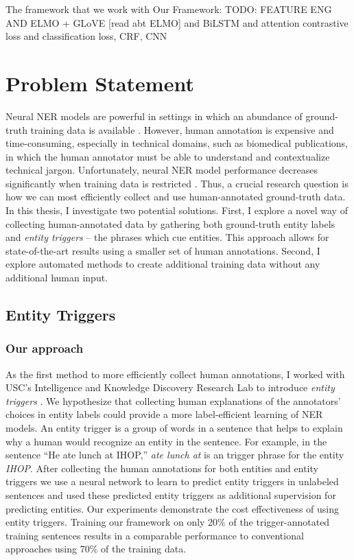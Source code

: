 The framework that we work with
Our Framework:
TODO: FEATURE ENG AND ELMO + GLoVE [read abt ELMO] and BiLSTM and attention contrastive loss and classification loss, CRF, CNN

\section{Problem Statement}
Neural NER models are powerful in settings in which an abundance of ground-truth training data is available \citep{LampleNER}. However, human annotation is expensive and time-consuming, especially in technical domains, such as biomedical publications, in which the human annotator must be able to understand and contextualize technical jargon. Unfortunately, neural NER model performance decreases significantly when training data is restricted \citep{TriggerNER}. Thus, a crucial research question is how we can most efficiently collect and use human-annotated ground-truth data. In this thesis, I investigate two potential solutions. First, I explore a novel way of collecting human-annotated data by gathering both ground-truth entity labels and \textit{entity triggers} -- the phrases which cue entities. This approach allows for state-of-the-art results using a smaller set of human annotations. Second, I explore automated methods to create additional training data without any additional human input.

\subsection{Entity Triggers}
\subsubsection{Our approach}
As the first method to more efficiently collect human annotations, I worked with USC's Intelligence and Knowledge Discovery Research Lab to introduce \textit{entity triggers} \citep{TriggerNER}. We hypothesize that collecting human explanations of the annotators' choices in entity labels could provide a more label-efficient learning of NER models. An entity trigger is a group of words in a sentence that helps to explain why a human would recognize an entity in the sentence. For example, in the sentence ``He ate lunch at IHOP,'' \textit{ate lunch at} is an trigger phrase for the entity \textit{IHOP}. After collecting the human annotations for both entities and entity triggers we use a neural network to learn to predict entity triggers in unlabeled sentences and used these predicted entity triggers as additional supervision for predicting entities. Our experiments demonstrate the cost effectiveness of using entity triggers. Training our framework on only 20\% of the trigger-annotated training sentences results in a comparable performance to conventional approaches using 70\% of the training data.

